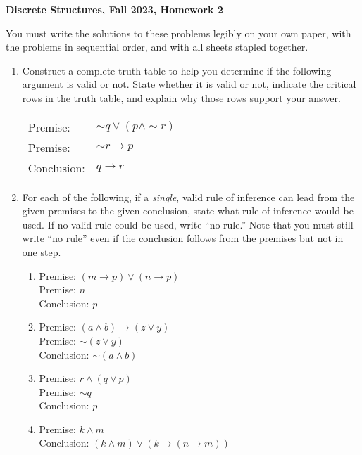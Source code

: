 \documentclass[12pt, letterpaper]{report}
\newcommand{\nott}{{\sim}}
\begin{document}
{\textbf{Discrete Structures, Fall 2023, Homework 2}}

\medbreak

You must write the solutions to these problems legibly on your own paper, with
the problems in sequential order, and with all sheets stapled together.

\begin{enumerate}

	\item Construct a complete truth table to help you determine if the following 
	argument is valid or not. State whether it is valid or not, indicate the critical rows in the truth table, 
	and explain why those rows support your answer.
	
	\begin{tabular}{ll}
		Premise: & $\nott q \lor (p \land \nott r)$ \\
		Premise: & $\nott r \to p$ \\
		Conclusion: & $q \to r$
	\end{tabular}
	
	\item For each of the following, if a \emph{single}, valid rule of inference can lead from the given premises to the given conclusion, state what
	rule of inference would be used. If no valid rule could be used, write ``no rule.''  Note that you must still write ``no rule'' even if the conclusion follows from the premises but not in one step.

	\begin{enumerate}
		\item 
		Premise:  $(m \to p) \lor (n \to p)$ \\
		Premise:  $n$ \\
		Conclusion: $p$ \\

		\item 
		Premise:  $(a \land b) \to (z \lor y)$ \\
		Premise:  $\nott (z \lor y)$ \\
		Conclusion: $\nott (a \land b)$  \\

		\item 
		Premise:  $r \land (q \lor p)$ \\
		Premise:  $\nott q$ \\
		Conclusion: $p$  \\
		
		\item 
		Premise:  $k \land m$ \\
		Conclusion: $(k \land m) \lor (k \to (n \to m))$ \\


\end{enumerate}
\end{enumerate}
\end{document}
